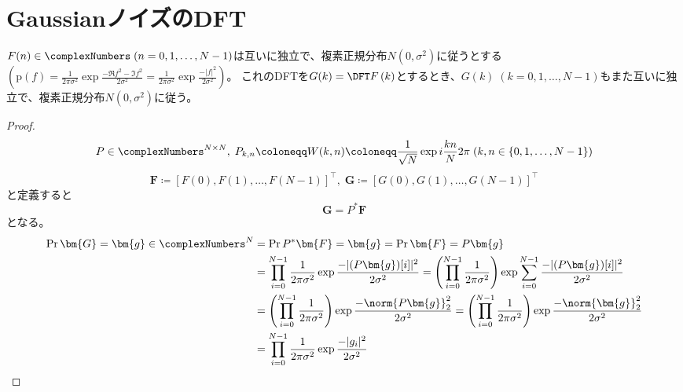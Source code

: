     \section{GaussianノイズのDFT}
        \begin{shadebox}
            $F(n) \in \complexNumbers\;(n=0,1,\dots,N-1)$は互いに独立で、複素正規分布$N(0,\sigma^2)$に従うとする$\left(\text{p}(f) = \frac{1}{2\pi\sigma^2}\exp\frac{-\Re{f}^2-\Im{f}^2}{2\sigma^2} = \frac{1}{2\pi\sigma^2}\exp\frac{-|f|^2}{2\sigma^2}\right)$。
            これのDFTを$G(k) = \DFTwithArg{F}{k}$とするとき、$G(k)\;(k=0,1,\dots,N-1)$もまた互いに独立で、複素正規分布$N(0,\sigma^2)$に従う。
        \end{shadebox}
        \begin{proof}
            \[ P \in \complexNumbers^{N\times N},\; P_{k,n} \coloneqq W(k,n) \coloneqq \frac{1}{\sqrt{N}}\exp i\frac{kn}{N}2\pi\;(k,n \in \{0,1,\dots,N-1\}) \]
            \[ \bm{F} \coloneqq [F(0), F(1), \dots, F(N-1)]^\top,\;\bm{G} \coloneqq [G(0), G(1), \dots, G(N-1)]^\top \]
            と定義すると
            \[ \bm{G} = P^*\bm{F} \]
            となる。
            \begin{align*}
                \Pr{\bm{G} = \bm{g} \in \complexNumbers^N} &= \Pr{P^*\bm{F} = \bm{g}} = \Pr{\bm{F} = P\bm{g}} \\
                &= \prod_{i=0}^{N-1}\frac{1}{2\pi\sigma^2} \exp\frac{-|(P\bm{g})[i]|^2}{2\sigma^2} = \left(\prod_{i=0}^{N-1}\frac{1}{2\pi\sigma^2}\right) \exp \sum_{i=0}^{N-1} \frac{-|(P\bm{g})[i]|^2}{2\sigma^2} \\
                &= \left(\prod_{i=0}^{N-1}\frac{1}{2\pi\sigma^2}\right) \exp \frac{-\norm{P\bm{g}}_2^2}{2\sigma^2} = \left(\prod_{i=0}^{N-1}\frac{1}{2\pi\sigma^2}\right) \exp \frac{-\norm{\bm{g}}_2^2}{2\sigma^2} \\
                &= \prod_{i=0}^{N-1}\frac{1}{2\pi\sigma^2} \exp \frac{-|g_i|^2}{2\sigma^2}
            \end{align*}
        \end{proof}